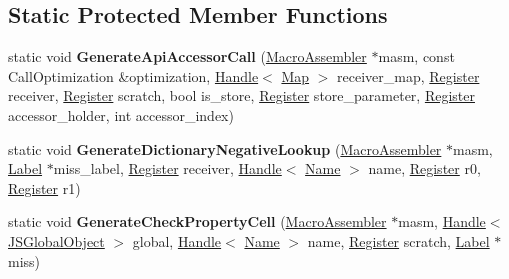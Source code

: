 \subsection*{Static Protected Member Functions}
\begin{DoxyCompactItemize}
\item 
static void {\bfseries Generate\+Api\+Accessor\+Call} (\hyperlink{classv8_1_1internal_1_1_macro_assembler}{Macro\+Assembler} $\ast$masm, const Call\+Optimization \&optimization, \hyperlink{classv8_1_1internal_1_1_handle}{Handle}$<$ \hyperlink{classv8_1_1internal_1_1_map}{Map} $>$ receiver\+\_\+map, \hyperlink{structv8_1_1internal_1_1_register}{Register} receiver, \hyperlink{structv8_1_1internal_1_1_register}{Register} scratch, bool is\+\_\+store, \hyperlink{structv8_1_1internal_1_1_register}{Register} store\+\_\+parameter, \hyperlink{structv8_1_1internal_1_1_register}{Register} accessor\+\_\+holder, int accessor\+\_\+index)\hypertarget{classv8_1_1internal_1_1_property_handler_compiler_a29a4cdc8a5586a08bc1b21c4a6f5b98c}{}\label{classv8_1_1internal_1_1_property_handler_compiler_a29a4cdc8a5586a08bc1b21c4a6f5b98c}

\item 
static void {\bfseries Generate\+Dictionary\+Negative\+Lookup} (\hyperlink{classv8_1_1internal_1_1_macro_assembler}{Macro\+Assembler} $\ast$masm, \hyperlink{classv8_1_1internal_1_1_label}{Label} $\ast$miss\+\_\+label, \hyperlink{structv8_1_1internal_1_1_register}{Register} receiver, \hyperlink{classv8_1_1internal_1_1_handle}{Handle}$<$ \hyperlink{classv8_1_1internal_1_1_name}{Name} $>$ name, \hyperlink{structv8_1_1internal_1_1_register}{Register} r0, \hyperlink{structv8_1_1internal_1_1_register}{Register} r1)\hypertarget{classv8_1_1internal_1_1_property_handler_compiler_abee80afea50a5a66ac6b69dcc46a2c96}{}\label{classv8_1_1internal_1_1_property_handler_compiler_abee80afea50a5a66ac6b69dcc46a2c96}

\item 
static void {\bfseries Generate\+Check\+Property\+Cell} (\hyperlink{classv8_1_1internal_1_1_macro_assembler}{Macro\+Assembler} $\ast$masm, \hyperlink{classv8_1_1internal_1_1_handle}{Handle}$<$ \hyperlink{classv8_1_1internal_1_1_j_s_global_object}{J\+S\+Global\+Object} $>$ global, \hyperlink{classv8_1_1internal_1_1_handle}{Handle}$<$ \hyperlink{classv8_1_1internal_1_1_name}{Name} $>$ name, \hyperlink{structv8_1_1internal_1_1_register}{Register} scratch, \hyperlink{classv8_1_1internal_1_1_label}{Label} $\ast$miss)\hypertarget{classv8_1_1internal_1_1_property_handler_compiler_ae56b23f38944af3bf62d7edcb66adfb3}{}\label{classv8_1_1internal_1_1_property_handler_compiler_ae56b23f38944af3bf62d7edcb66adfb3}

\end{DoxyCompactItemize}
